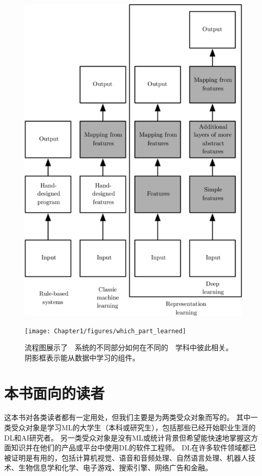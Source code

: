 \begin{figure}[!htb]
\ifOpenSource
\centerline{\includegraphics[scale=0.5]{images/5.png}}
\else
\centerline{\texttt{[image: Chapter1/figures/which\_part\_learned]}}
\fi
\caption{流程图展示了~~系统的不同部分如何在不同的~~学科中彼此相关。
阴影框表示能从数据中学习的组件。}
\label{fig:chap1_which_part_learned}
\end{figure}

\section{本书面向的读者}
\label{sec:who_should_read_this_book}

这本书对各类读者都有一定用处，但我们主要是为两类受众对象而写的。
其中一类受众对象是学习\gls{ML}的大学生（本科或研究生），包括那些已经开始职业生涯的\gls{DL}和\gls{AI}研究者。
另一类受众对象是没有\gls{ML}或统计背景但希望能快速地掌握这方面知识并在他们的产品或平台中使用\gls{DL}的软件工程师。
\gls{DL}在许多软件领域都已被证明是有用的，包括计算机视觉、语音和音频处理、自然语言处理、机器人技术、生物信息学和化学、电子游戏、搜索引擎、网络广告和金融。


